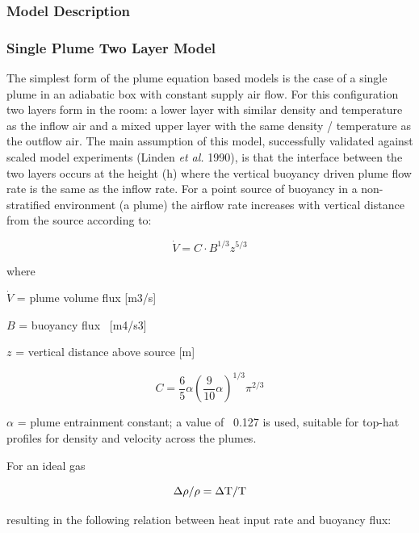 \subsubsection{Model Description}\label{model-description-002}

\subsubsection{Single Plume Two Layer Model}\label{single-plume-two-layer-model}

The simplest form of the plume equation based models is the case of a single plume in an adiabatic box with constant supply air flow. For this configuration two layers form in the room: a lower layer with similar density and temperature as the inflow air and a mixed upper layer with the same density / temperature as the outflow air. The main assumption of this model, successfully validated against scaled model experiments (Linden \emph{et al.} 1990), is that the interface between the two layers occurs at the height (h) where the vertical buoyancy driven plume flow rate is the same as the inflow rate. For a point source of buoyancy in a non-stratified environment (a plume) the airflow rate increases with vertical distance from the source according to:

\begin{equation}
\dot V = C\cdot {B^{1/3}}{z^{5/3}}
\end{equation}

where

\(\dot V\) = plume volume flux {[}m3/s{]}

\(B\) = buoyancy flux~ {[}m4/s3{]}

\(z\) = vertical distance above source {[}m{]}

\begin{equation}
C = \frac{6}{5}\alpha {(\frac{9}{{10}}\alpha )^{1/3}}{\pi ^{2/3}}
\end{equation}

\(\alpha\) = plume entrainment constant; a value of~ 0.127 is used, suitable for top-hat profiles for density and velocity across the plumes.

For an ideal gas

\begin{equation}
\Delta \rho /\rho  = \Delta {\rm T}/{\rm T}
\end{equation}

resulting in the following relation between heat input rate and buoyancy flux:

